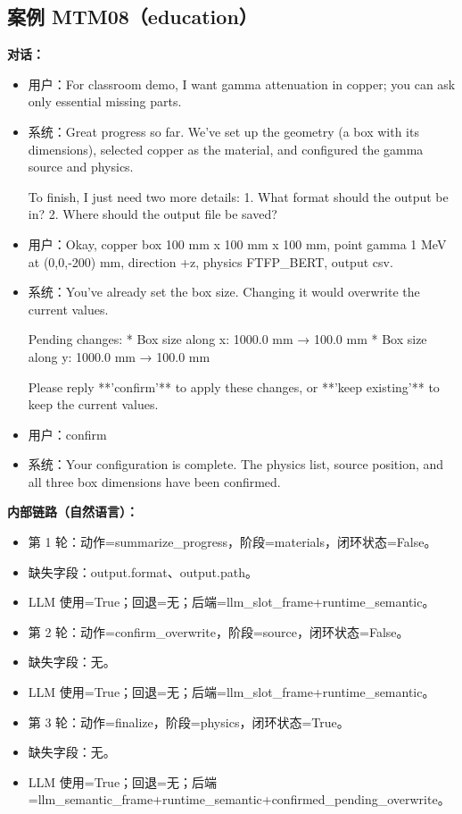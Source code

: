 \documentclass[11pt]{ctexart}
\begin{document}
\subsection{案例 MTM08（education）}
\textbf{对话：}
\begin{itemize}
\item 用户：For classroom demo, I want gamma attenuation in copper; you can ask only essential missing parts.
\item 系统：Great progress so far. We've set up the geometry (a box with its dimensions), selected copper as the material, and configured the gamma source and physics.

To finish, I just need two more details:
1. What format should the output be in?
2. Where should the output file be saved?
\item 用户：Okay, copper box 100 mm x 100 mm x 100 mm, point gamma 1 MeV at (0,0,-200) mm, direction +z, physics FTFP\_BERT, output csv.
\item 系统：You've already set the box size. Changing it would overwrite the current values.

Pending changes:
*   Box size along x: 1000.0 mm → 100.0 mm
*   Box size along y: 1000.0 mm → 100.0 mm

Please reply **'confirm'** to apply these changes, or **'keep existing'** to keep the current values.
\item 用户：confirm
\item 系统：Your configuration is complete. The physics list, source position, and all three box dimensions have been confirmed.
\end{itemize}
\textbf{内部链路（自然语言）：}
\begin{itemize}
\item 第 1 轮：动作=summarize\_progress，阶段=materials，闭环状态=False。
\item 缺失字段：output.format、output.path。
\item LLM 使用=True；回退=无；后端=llm\_slot\_frame+runtime\_semantic。
\item 第 2 轮：动作=confirm\_overwrite，阶段=source，闭环状态=False。
\item 缺失字段：无。
\item LLM 使用=True；回退=无；后端=llm\_slot\_frame+runtime\_semantic。
\item 第 3 轮：动作=finalize，阶段=physics，闭环状态=True。
\item 缺失字段：无。
\item LLM 使用=True；回退=无；后端=llm\_semantic\_frame+runtime\_semantic+confirmed\_pending\_overwrite。
\end{itemize}
\end{document}
